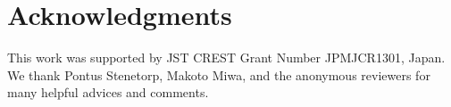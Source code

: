 \documentclass[11pt,a4paper]{article}
\newcommand{\onetoone}{\textsc{1-to-1}\xspace}
\newcommand{\oneton}{\textsc{1-to-N}\xspace}
\newcommand{\ntoone}{\textsc{N-to-1}\xspace}
\newcommand{\nton}{\textsc{N-to-N}\xspace}
\begin{document}


\section*{Acknowledgments}

This work was supported by JST CREST Grant Number JPMJCR1301, Japan. We thank 
Pontus Stenetorp, Makoto Miwa, and the anonymous reviewers for many helpful 
advices and comments.




\appendix


\end{document}
